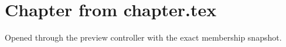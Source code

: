 \section{Chapter from chapter.tex}
Opened through the preview controller with the exact membership snapshot.


